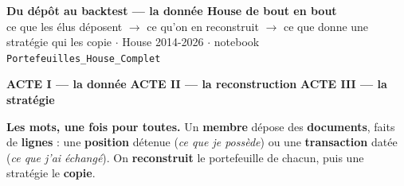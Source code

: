 \documentclass[10pt,a4paper]{article}
\begin{document}
\begin{center}
{\large\bfseries Du dépôt au backtest --- la donnée House de bout en bout}\\[0.2mm]
{\scriptsize ce que les élus déposent $\rightarrow$ ce qu'on en reconstruit $\rightarrow$ ce que donne une
stratégie qui les copie $\cdot$ House 2014-2026 $\cdot$ notebook \texttt{Portefeuilles\_House\_Complet}}
\end{center}
\vspace{0.9mm}

\begin{tcolorbox}[enhanced, colback=white, colframe=grisc, boxrule=0.5pt, arc=2pt,
                  left=3mm, right=3mm, top=1.1mm, bottom=1.1mm]
{\footnotesize\bfseries\color{bleu} ACTE I --- la donnée}\hfill
{\footnotesize\bfseries\color{vert} ACTE II --- la reconstruction}\hfill
{\footnotesize\bfseries\color{orange} ACTE III --- la stratégie}\\[0.8mm]
\begin{center}
\end{center}
\vspace{0.3mm}
{\footnotesize\textbf{Les mots, une fois pour toutes.} Un \textbf{membre} dépose des \textbf{documents},
faits de \textbf{lignes} : une \textbf{position} détenue (\emph{ce que je possède}) ou une
\textbf{transaction} datée (\emph{ce que j'ai échangé}). On \textbf{reconstruit} le portefeuille de chacun,
puis une stratégie le \textbf{copie}.}
\end{tcolorbox}
\end{document}
